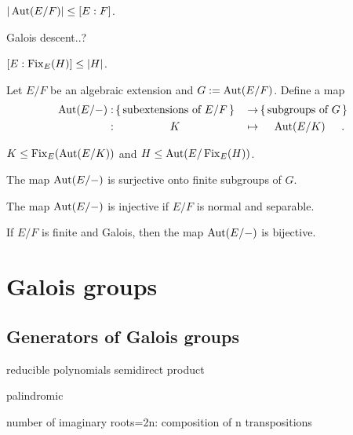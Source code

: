 \documentclass{../note}
\begin{document}
\begin{prb}

\begin{parts}
\item $|\operatorname{Aut}(E/F)|\le[E:F]$.
\end{parts}
\end{prb}

\begin{prb}
Galois descent..?
\begin{parts}
\item $[E:\operatorname{Fix}_E(H)]\le|H|$.
\end{parts}
\end{prb}

\begin{prb}
Let $E/F$ be an algebraic extension and $G:=\operatorname{Aut}(E/F)$.
Define a map
\begin{alignat*}{2}
\Aut(E/-)
:&\,\{\,\text{subextensions of $E/F$}\,\}\,&\to&\,\{\,\text{subgroups of $G$}\,\}\,\\
:&\omit\hfil$K$\hfil&\mapsto&\omit\hfil$\Aut(E/K)$\hfil.
\end{alignat*}
\begin{parts}
\item $K\le \operatorname{Fix}_E(\operatorname{Aut}(E/K))$ and $H\le\operatorname{Aut}(E/\operatorname{Fix}_E(H))$.
\item The map $\operatorname{Aut}(E/-)$ is surjective onto finite subgroups of $G$.
\item The map $\operatorname{Aut}(E/-)$ is injective if $E/F$ is normal and separable.
\item If $E/F$ is finite and Galois, then the map $\operatorname{Aut}(E/-)$ is bijective.
\end{parts}
\end{prb}




\part{Galois groups}


\chapter{Generators of Galois groups}


reducible polynomials
semidirect product

\begin{prb}
\end{prb}
\begin{prb}
\end{prb}
\begin{prb}
palindromic
\end{prb}
\begin{prb}
number of imaginary roots=2n: composition of n transpositions
\end{prb}
\end{document}
